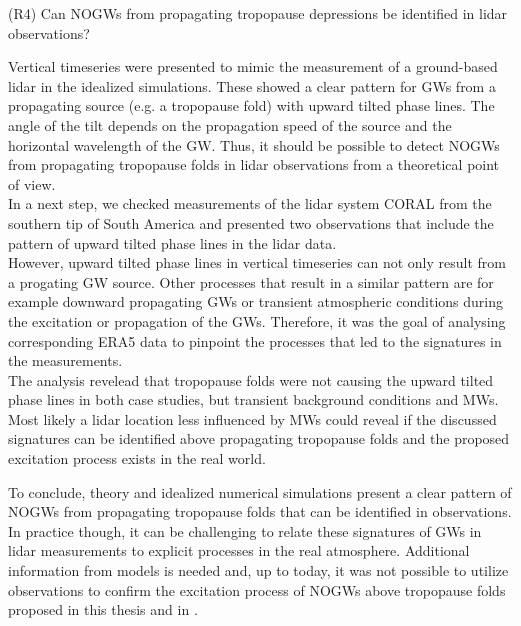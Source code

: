 \begin{tcolorbox}[]
    (R4) Can NOGWs from propagating tropopause depressions be identified in lidar observations?
\end{tcolorbox}

Vertical timeseries were presented to mimic the measurement of a ground-based lidar in the idealized simulations. These showed a clear pattern for GWs from a propagating source (e.g. a tropopause fold) with upward tilted phase lines. The angle of the tilt depends on the propagation speed of the source and the horizontal wavelength of the GW. Thus, it should be possible to detect NOGWs from propagating tropopause folds in lidar observations from a theoretical point of view. \\
In a next step, we checked measurements of the lidar system CORAL from the southern tip of South America and presented two observations that include the pattern of upward tilted phase lines in the lidar data. \\
However, upward tilted phase lines in vertical timeseries can not only result from a progating GW source. Other processes that result in a similar pattern are for example downward propagating GWs or transient atmospheric conditions during the excitation or propagation of the GWs. Therefore, it was the goal of analysing corresponding ERA5 data to pinpoint the processes that led to the signatures in the measurements. \\
The analysis revelead that tropopause folds were not causing the upward tilted phase lines in both case studies, but transient background conditions and MWs. Most likely a lidar location less influenced by MWs could reveal if the discussed signatures can be identified above propagating tropopause folds and the proposed excitation process exists in the real world.

To conclude, theory and idealized numerical simulations present a clear pattern of NOGWs from propagating tropopause folds that can be identified in observations. In practice though, it can be challenging to relate these signatures of GWs in lidar measurements to explicit processes in the real atmosphere. Additional information from models is needed and, up to today, it was not possible to utilize observations to confirm the excitation process of NOGWs above tropopause folds proposed in this thesis and in \textcite[]{dornbrack_stratospheric_2022}.
